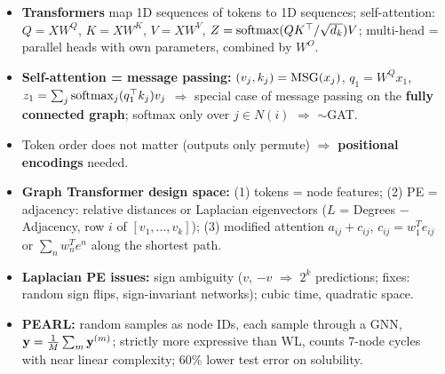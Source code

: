\bigskip{}
{}
\begin{summarybox}
  \begin{itemize}
    \item \textbf{Transformers} map 1D sequences of tokens to 1D sequences;
      self-attention: $Q=XW^Q$, $K=XW^K$, $V=XW^V$,
      $Z=\operatorname{softmax}(QK^{\top}/\sqrt{d_k})V$; multi-head = parallel heads with own
      parameters, combined by $W^O$.
    \item \textbf{Self-attention = message passing:} $(v_j,k_j)=\operatorname{MSG}(x_j)$,
      $q_1=W^Qx_1$, $z_1=\sum_j\operatorname{softmax}_j(q_1^{\top} k_j)v_j$ $\Rightarrow$ special
      case of message passing on the \textbf{fully connected graph}; softmax
      only over $j\in N(i)$ $\Rightarrow$ $\sim$GAT.
    \item Token order does not matter (outputs only permute) $\Rightarrow$
      \textbf{positional encodings} needed.
    \item \textbf{Graph Transformer design space:} (1) tokens = node features;
      (2) PE = adjacency: relative distances or Laplacian eigenvectors
      ($L$ = Degrees $-$ Adjacency, row $i$ of $[v_1,\dots,v_k]$);
      (3) modified attention $a_{ij}+c_{ij}$, $c_{ij}=w_1^Te_{ij}$ or
      $\sum_n w_n^Te^n$ along the shortest path.
    \item \textbf{Laplacian PE issues:} sign ambiguity ($v$, $-v$ $\Rightarrow$
      $2^k$ predictions; fixes: random sign flips, sign-invariant networks);
      cubic time, quadratic space.
    \item \textbf{PEARL:} random samples as node IDs, each sample through a GNN,
      $\mathbf{y}=\frac{1}{M}\sum_m\mathbf{y}^{(m)}$; strictly more expressive than WL, counts
      7-node cycles with near linear complexity; 60\% lower test error on
      solubility.
  \end{itemize}
\end{summarybox}
